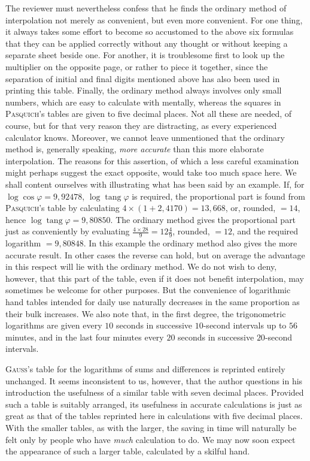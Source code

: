 The reviewer must nevertheless confess that he finds the ordinary method of interpolation not merely as convenient, but even more convenient. For one thing, it always takes some effort to become so accustomed to the above six formulas that they can be applied correctly without any thought or without keeping a separate sheet beside one. For another, it is troublesome first to look up the multiplier on the opposite page, or rather to piece it together, since the separation of initial and final digits mentioned above has also been used in printing this table. Finally, the ordinary method always involves only small numbers, which are easy to calculate with mentally, whereas the squares in \textsc{Pasquich}'s tables are given to five decimal places. Not all these are needed, of course, but for that very reason they are distracting, as every experienced calculator knows. Moreover, we cannot leave unmentioned that the ordinary method is, generally speaking, \textit{more accurate} than this more elaborate interpolation. The reasons for this assertion, of which a less careful examination might perhaps suggest the exact opposite, would take too much space here. We shall content ourselves with illustrating what has been said by an example. If, for \(\log\cos\varphi=9{,}92478\), \(\log\operatorname{tang}\varphi\) is required, the proportional part is found from \textsc{Pasquich}'s table by calculating \(4\times(1+2{,}4170)=13{,}668\), or, rounded, \(=14\), hence \(\log\operatorname{tang}\varphi=9{,}80850\). The ordinary method gives the proportional part just as conveniently by evaluating \(\frac{4\times28}{9}=12\frac49\), rounded, \(=12\), and the required logarithm \(=9{,}80848\). In this example the ordinary method also gives the more accurate result. In other cases the reverse can hold, but on average the advantage in this respect will lie with the ordinary method. We do not wish to deny, however, that this part of the table, even if it does not benefit interpolation, may sometimes be welcome for 
other purposes. But the convenience of logarithmic hand tables intended for daily use naturally decreases in the same proportion as their bulk increases. We also note that, in the first degree, the trigonometric logarithms are given every \(10\) seconds in successive \(10\)-second intervals up to \(56\) minutes, and in the last four minutes every \(20\) seconds in successive \(20\)-second intervals.

\textsc{Gauss}'s table for the logarithms of sums and differences is reprinted entirely unchanged. It seems inconsistent to us, however, that the author questions in his introduction the usefulness of a similar table with seven decimal places. Provided such a table is suitably arranged, its usefulness in accurate calculations is just as great as that of the tables reprinted here in calculations with five decimal places. With the smaller tables, as with the larger, the saving in time will naturally be felt only by people who have \textit{much} calculation to do. We may now soon expect the appearance of such a larger table, calculated by a skilful hand.

